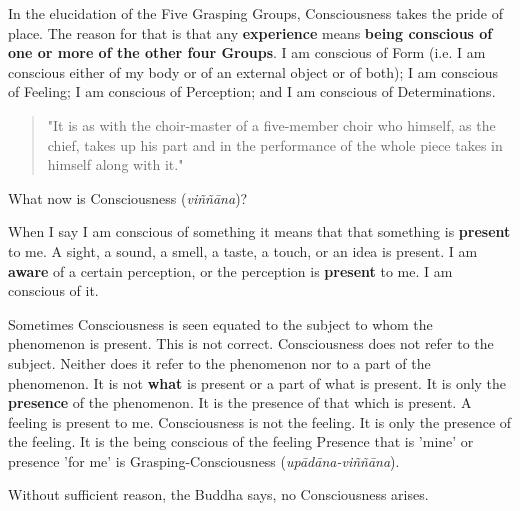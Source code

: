 In the elucidation of the Five Grasping Groups, Consciousness takes the pride of place. The reason for that is that any \textbf{experience} means \textbf{being conscious of one or more of the other four Groups}. I am conscious of Form (i.e. I am conscious either of my body or of an external object or of both); I am conscious of Feeling; I am conscious of Perception; and I am conscious of Determinations.

\begin{quote}
"It is as with the choir-master of a five-member choir who himself, as the chief, takes up his part and in the performance of the whole piece takes in himself along with it."
\end{quote}

What now is Consciousness (\emph{viññāna})?

When I say I am conscious of something it means that that something is \textbf{present} to me. A sight, a sound, a smell, a taste, a touch, or an idea is present. I am \textbf{aware} of a certain perception, or the perception is \textbf{present} to me. I am conscious of it.

Sometimes Consciousness is seen equated to the subject to whom the phenomenon is present. This is not correct. Consciousness does not refer to the subject. Neither does it refer to the phenomenon nor to a part of the phenomenon. It is not \textbf{what} is present or a part of what is present. It is only the \textbf{presence} of the phenomenon. It is the presence of that which is present. A feeling is present to me. Consciousness is not the feeling. It is only the presence of the feeling. It is the being conscious of the feeling Presence that is 'mine' or presence 'for me' is Grasping-Consciousness (\emph{upādāna-viññāna}).

Without sufficient reason, the Buddha says, no Consciousness arises.

